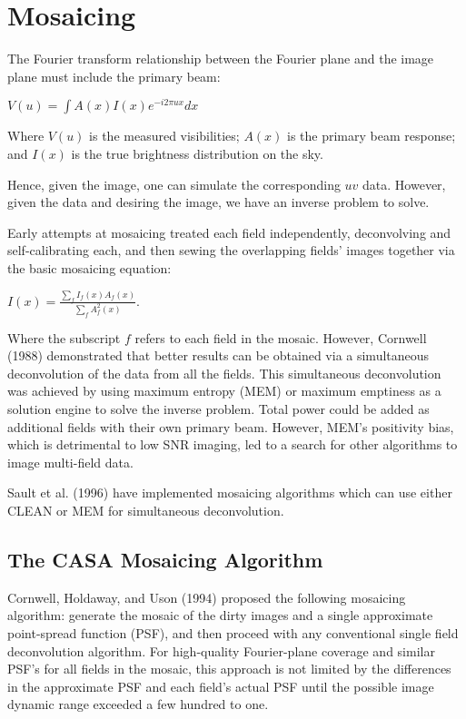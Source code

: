 \section{Mosaicing}
\label{section:imtool.mosaic}

The Fourier transform relationship between the Fourier plane and
the image plane must include the primary beam:

$ V(u) = \int A(x) I(x) e^{-i2 \pi u x} dx $

Where $V(u)$ is the measured visibilities; $A(x)$ is the primary beam
response; and $I(x)$ is the true brightness distribution on the sky.

Hence, given the image, one can simulate the corresponding $uv$
data.  However, given the data and desiring the image, we have an
inverse problem to solve.

Early attempts at mosaicing treated each field independently,
deconvolving and self-calibrating each, and then sewing the overlapping
fields' images together via the basic mosaicing equation:

$I(x) = \frac{ \sum_f I_{f}(x)  A_{f}(x) } { \sum_f A^{2}_{f}(x) }.$

Where the subscript $f$ refers to each field in the mosaic.  However,
Cornwell (1988) demonstrated that better results can be obtained via a
simultaneous deconvolution of the data from all the fields.  This
simultaneous deconvolution was achieved by using maximum entropy (MEM)
or maximum emptiness as a solution engine to solve the inverse
problem.  Total power could be added as additional fields with their
own primary beam.  However, MEM's positivity bias, which is
detrimental to low SNR imaging, led to a search for other algorithms
to image multi-field data.

Sault et al. (1996) have implemented mosaicing algorithms which
can use either CLEAN or MEM for simultaneous deconvolution.

\subsection{The CASA Mosaicing Algorithm}
\label{section:imtool.mosaic.algorithm}

Cornwell, Holdaway, and Uson (1994) proposed the following mosaicing
algorithm: generate the mosaic of the dirty images and a single
approximate point-spread function (PSF), and then proceed with any
conventional single field deconvolution algorithm.  For high-quality
Fourier-plane coverage and similar PSF's for all fields in the mosaic,
this approach is not limited by the differences in the approximate PSF
and each field's actual PSF until the possible image dynamic range
exceeded a few hundred to one.

